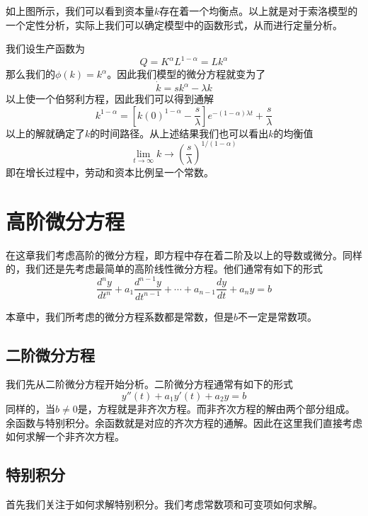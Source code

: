 \documentclass[UTF8,12pt]{ctexart}
\numberwithin{equation}{section} %
\numberwithin{figure}{section}
\numberwithin{table}{section}
\begin{document}
	如上图所示，我们可以看到资本量$k$存在着一个均衡点。以上就是对于索洛模型的一个定性分析，实际上我们可以确定模型中的函数形式，从而进行定量分析。
	
	我们设生产函数为
	\begin{equation}
		Q = K^{\alpha}L^{1 - \alpha} = Lk^{\alpha}
	\end{equation}
	那么我们的$\phi(k) = k^{\alpha}$。因此我们模型的微分方程就变为了
	\begin{equation}
		\dot{k} =sk^{\alpha} -  \lambda k
	\end{equation}
	以上使一个伯努利方程，因此我们可以得到通解
	\begin{equation}
		k^{1-\alpha} = [k(0)^{1-\alpha} - \frac{s}{\lambda}]e^{-(1 - \alpha)\lambda t} + \frac{s}{\lambda}
	\end{equation}
	以上的解就确定了$k$的时间路径。从上述结果我们也可以看出$k$的均衡值
	\begin{equation}
		\lim\limits_{t \to \infty}k \to (\frac{s}{\lambda})^{1/(1 - \alpha)}
	\end{equation}
	即在增长过程中，劳动和资本比例呈一个常数。
		
	
	\newpage
	
	\section{高阶微分方程}
	在这章我们考虑高阶的微分方程，即方程中存在着二阶及以上的导数或微分。同样的，我们还是先考虑最简单的高阶线性微分方程。他们通常有如下的形式
	\begin{equation}
		\frac{d^n y}{d t^n} + a_1 \frac{d^{n-1} y}{d t^{n-1}} + \cdots + a_{n-1} \frac{dy}{dt} + a_n y = b
	\end{equation}
	
	本章中，我们所考虑的微分方程系数都是常数，但是$b$不一定是常数项。
	
	\subsection{二阶微分方程}
	我们先从二阶微分方程开始分析。二阶微分方程通常有如下的形式
	\begin{equation}
		y''(t) + a_1 y'(t) + a_2 y = b
	\end{equation}
	同样的，当$b \neq 0$是，方程就是非齐次方程。而非齐次方程的解由两个部分组成。余函数与特别积分。余函数就是对应的齐次方程的通解。因此在这里我们直接考虑如何求解一个非齐次方程。
	
	\subsection{特别积分}
	首先我们关注于如何求解特别积分。我们考虑常数项和可变项如何求解。
	
\end{document}
